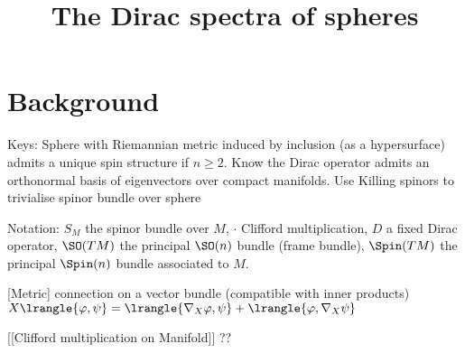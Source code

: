 \documentclass[11pt]{report}
\title{The Dirac spectra of spheres}
\begin{document}
\maketitle
\begin{abstract}
    
\end{abstract}
\chapter{Background}
\vspace*{-30pt}
Keys: Sphere with Riemannian metric induced by inclusion (as a hypersurface) admits a unique spin structure if $n \geq 2$. Know the Dirac operator admits an orthonormal basis of eigenvectors over compact manifolds. Use Killing spinors to trivialise spinor bundle over sphere

Notation: $S_M$ the spinor bundle over $M$, $\cdot$ Clifford multiplication, $D$ a fixed Dirac operator, $\SO(TM)$ the principal $\SO(n)$ bundle (frame bundle), $\Spin(TM)$ the principal $\Spin(n)$ bundle associated to $M$.


[Metric] connection on a vector bundle (compatible with inner products) $X\lrangle{\varphi, \psi} = \lrangle{\nabla_X \varphi, \psi} + \lrangle{\varphi, \nabla_X \psi}$


[[Clifford multiplication on Manifold]] ??
\end{document}
